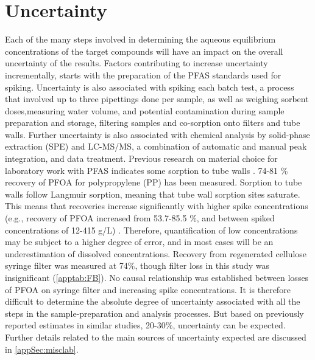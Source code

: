 \section{Uncertainty\label{sec:losses}}
Each of the many steps involved in determining the aqueous equilibrium concentrations of the target compounds will have an impact on the overall uncertainty of the results. Factors contributing to increase uncertainty incrementally, starts with the preparation of the PFAS standards used for spiking. Uncertainty is also associated with spiking each batch test, a process that involved up to three pipettings done per sample, as well as weighing sorbent doses,measuring water volume, and potential contamination during sample preparation and storage, filtering samples and co-sorption onto filters and tube walls. Further uncertainty is also associated with chemical analysis by solid-phase extraction (SPE) and LC-MS/MS, a combination of automatic and manual peak integration, and data treatment. Previous research on material choice for laboratory work with PFAS indicates some sorption to tube walls \citep{Lath2019labsorb}. 74-81 \% recovery of PFOA for polypropylene (PP) has been measured. Sorption to tube walls follow Langmuir sorption, meaning that tube wall sorption sites saturate. This means that recoveries increase significantly with higher spike concentrations (e.g., recovery of PFOA increased from 53.7-85.5 \%, and between spiked concentrations of 12-415 \textmu g/L) \citep{Lath2019labsorb}. Therefore, quantification of low concentrations may be subject to a higher degree of error, and in most cases will be an underestimation of dissolved concentrations. Recovery from regenerated cellulose syringe filter was measured at 74\%, though filter loss in this study was insignificant (\cref{apptab:FB}). No causal relationship was established between losses of PFOA on syringe filter and increasing spike concentrations. It is therefore difficult to determine the absolute degree of uncertainty associated with all the steps in the sample-preparation and analysis processes. But based on previously reported estimates in similar studies, 20-30\%, uncertainty can be expected. Further details related to the main sources of uncertainty expected are discussed in \cref{appSec:misclab}. 



